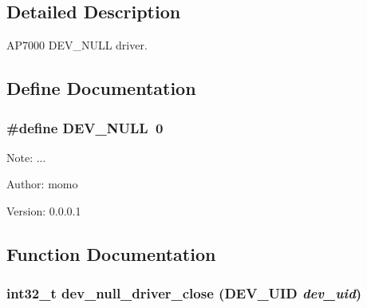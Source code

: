 \subsection{Detailed Description}
AP7000 DEV\_\-NULL driver. 

\subsection{Define Documentation}
\hypertarget{group___d_e_v___n_u_l_l___d_r_i_v_e_r_g8a3ec48b54d63808ed4c386c320fed47}{
\subsubsection[{DEV\_\-NULL}]{\setlength{\rightskip}{0pt plus 5cm}\#define DEV\_\-NULL~0}}
\label{group___d_e_v___n_u_l_l___d_r_i_v_e_r_g8a3ec48b54d63808ed4c386c320fed47}


\begin{Desc}
\item[Note:]... \end{Desc}
\begin{Desc}
\item[Author:]momo \end{Desc}
\begin{Desc}
\item[Version:]0.0.0.1 \end{Desc}


\subsection{Function Documentation}
\hypertarget{group___d_e_v___n_u_l_l___d_r_i_v_e_r_gbac6c3a551684ff0db74eb04020ebb26}{
\subsubsection[{dev\_\-null\_\-driver\_\-close}]{\setlength{\rightskip}{0pt plus 5cm}int32\_\-t dev\_\-null\_\-driver\_\-close ({\bf DEV\_\-UID} {\em dev\_\-uid})}}
\label{group___d_e_v___n_u_l_l___d_r_i_v_e_r_gbac6c3a551684ff0db74eb04020ebb26}


